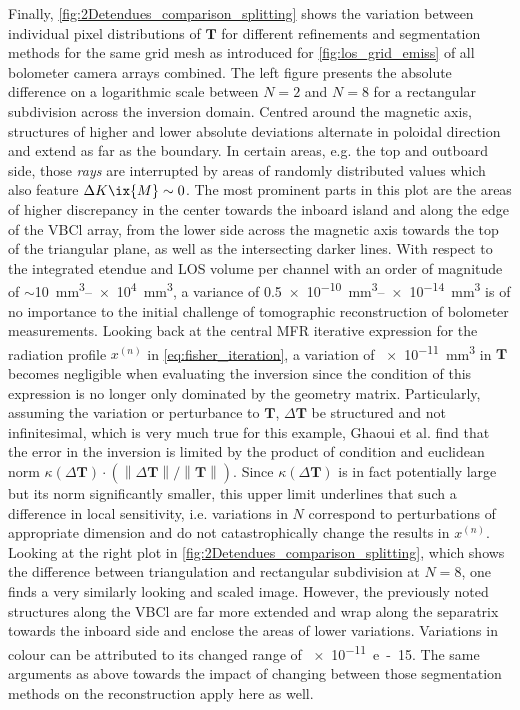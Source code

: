             Finally, \cref{fig:2Detendues_comparison_splitting} shows the variation between individual pixel distributions of $\mathbf{T}$ for different refinements and segmentation methods for the same grid mesh as introduced for \cref{fig:los_grid_emiss} of all bolometer camera arrays combined. The left figure presents the absolute difference on a logarithmic scale between $N=2$ and $N=8$ for a rectangular subdivision across the inversion domain. Centred around the magnetic axis, structures of higher and lower absolute deviations alternate in poloidal direction and extend as far as the boundary. In certain areas, e.g. the top and outboard side, those \textit{rays} are interrupted by areas of randomly distributed values which also feature $\Delta K\ix{M}\sim0$. The most prominent parts in this plot are the areas of higher discrepancy in the center towards the inboard island and along the edge of the VBCl array, from the lower side across the magnetic axis towards the top of the triangular plane, as well as the intersecting darker lines. With respect to the integrated etendue and LOS volume per channel with an order of magnitude of $\sim$\SIrange{10}{e4}{\cubic\milli\meter}, a variance of \SIrange{0.5e-10}{e-14}{\cubic\milli\meter} is of no importance to the initial challenge of tomographic reconstruction of bolometer measurements. Looking back at the central MFR iterative expression for the radiation profile $x^{\left(n\right)}$ in \cref{eq:fisher_iteration}, a variation of \SI{e-11}{\cubic\milli\meter} in $\mathbf{T}$ becomes negligible when evaluating the inversion since the condition of this expression is no longer only dominated by the geometry matrix. Particularly, assuming the variation or perturbance to $\mathbf{T}$, $\Delta\mathbf{T}$ be structured and not infinitesimal, which is very much true for this example, Ghaoui et al.\cite{Ghaoui2002} find that the error in the inversion is limited by the product of condition and euclidean norm $\kappa\left(\Delta\mathbf{T}\right)\cdot\left(\left\|\Delta \mathbf{T}\right\|/\left\|\mathbf{T}\right\|\right)$. Since $\kappa\left(\Delta\mathbf{T}\right)$ is in fact potentially large but its norm significantly smaller, this upper limit underlines that such a difference in local sensitivity, i.e. variations in $N$ correspond to perturbations of appropriate dimension and do not catastrophically change the results in $x^{\left(n\right)}$. Looking at the right plot in \cref{fig:2Detendues_comparison_splitting}, which shows the difference between triangulation and rectangular subdivision at $N=8$, one finds a very similarly looking and scaled image. However, the previously noted structures along the VBCl are far more extended and wrap along the separatrix towards the inboard side and enclose the areas of lower variations. Variations in colour can be attributed to its changed range of \SI{e-11}{e-15}. The same arguments as above towards the impact of changing between those segmentation methods on the reconstruction apply here as well.\\%
